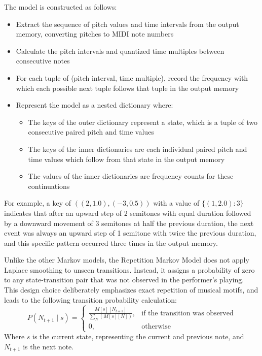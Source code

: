 The model is constructed as follows:
\begin{itemize}
    \item Extract the sequence of pitch values and time intervals from the output memory, converting pitches to MIDI note numbers
    \item Calculate the pitch intervals and quantized time multiples between consecutive notes
    \item For each tuple of (pitch interval, time multiple), record the frequency with which each possible next tuple follows that tuple in the output memory
    \item Represent the model as a nested dictionary where:
    \begin{itemize}
        \item The keys of the outer dictionary represent a state, which is a tuple of two consecutive paired pitch and time values
        \item The keys of the inner dictionaries are each individual paired pitch and time values which follow from that state in the output memory
        \item The values of the inner dictionaries are frequency counts for these continuations
    \end{itemize}
\end{itemize}
For example, a key of $((2, 1.0), (-3, 0.5))$ with a value of $\{(1, 2.0): 3\}$ indicates that after an upward step of 2 semitones with equal duration followed by a downward movement of 3 semitones at half the previous duration, the next event was always an upward step of 1 semitone with twice the previous duration, and this specific pattern occurred three times in the output memory.

Unlike the other Markov models, the Repetition Markov Model does not apply Laplace smoothing to unseen transitions. Instead, it assigns a probability of zero to any state-transition pair that was not observed in the performer's playing. This design choice deliberately emphasizes exact repetition of musical motifs, and leads to the following transition probability calculation:
\begin{equation}
    P( N_{t+1} \mid s) = 
    \begin{cases}
        \frac{M[s][N_{t+1}]}{\sum_{N}(M[s][N])}, & \text{if the transition was observed} \\
        0, & \text{otherwise}
    \end{cases}
\end{equation}
Where $s$ is the current state, representing the current and previous note, and $N_{t+1}$ is the next note.

